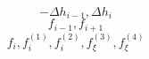 \begin{equation} 
- \Delta h_{{i-1}} , \Delta h_{{i}}
 \end{equation}\begin{equation} 
f_{{i-1}} , f_{{i+1}}
 \end{equation}\begin{equation} 
f_{i} , f^{{(1)}}_{i} , f^{{(2)}}_{i} , f^{{(3)}}_{{\xi}} , f^{{(4)}}_{{\xi}}
 \end{equation}